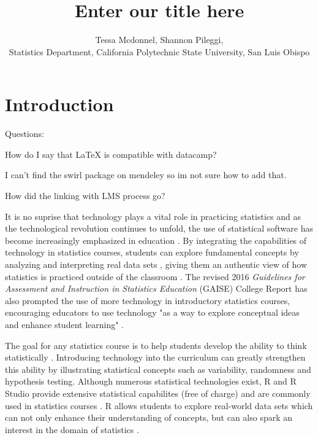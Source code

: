 \documentclass[12pt]{article}
\title{Enter our title here}
\author{Tessa Mcdonnel, Shannon Pileggi,  \\Statistics Department, California Polytechnic State University, San Luis Obispo}
\begin{document}
\maketitle

\section{Introduction}

\doublespacing

Questions: 

How do I say that LaTeX is compatible with datacamp?

I can't find the swirl package on mendeley so im not sure how to add that.

How did the linking with LMS process go?


It is no suprise that technology plays a vital role in practicing statistics and as the technological revolution continues to
unfold, the use of statistical software has become increasingly emphasized in education \citep{AmericanStatisticalAssociation2016}. By integrating the
capabilities of technology in statistics courses, students can explore fundamental concepts by analyzing and
interpreting real data sets \citep{Chance2007, Hardin2015, Horton2014}, giving them an authentic view of how statistics is practiced outside of the
classroom \citep{Wang2017}. The revised 2016 \textit{Guidelines for Assessment and Instruction in Statistics Education}
(GAISE) College Report has also prompted the use of more technology in introductory statistics courses, encouraging educators
to use technology "as a way to explore conceptual ideas and enhance student learning" \citep{AmericanStatisticalAssociation2016}.

The goal for any statistics course is to help students develop the ability to think statistically
\citep{AmericanStatisticalAssociation2016}.
Introducing technology into the curriculum can greatly strengthen this ability by illustrating statistical concepts such as
variability, randomness and hypothesis testing. Although numerous statistical technologies exist, R and R Studio
provide extensive statistical capabilites (free of charge) and are commonly used in statistics courses \citep{Chance2007}. R
allows students to explore real-world data sets which can not only enhance their understanding of concepts, but can also spark
an interest in the domain of statistics \citep{Wang2017}.
\end{document}
